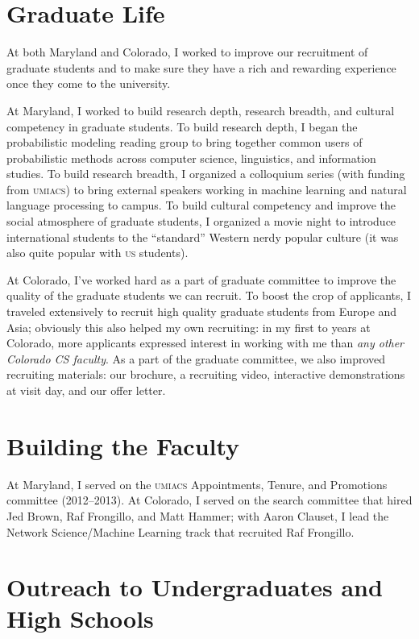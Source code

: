 \documentclass[11pt]{amsart}
\newcommand{\abr}[1]{\textsc{#1}}
\begin{document}
\section{Graduate Life}

At both Maryland and Colorado, I worked to improve our recruitment of graduate
students and to make sure they have a rich and rewarding experience once they
come to the university.

At Maryland, I worked to build research depth, research breadth, and cultural
competency in graduate students.  To build research depth, I began the
probabilistic modeling reading group to bring together common users of
probabilistic methods across computer science, linguistics, and information
studies.  To build research breadth, I organized a colloquium series (with
funding from \abr{umiacs}) to bring external speakers working in machine
learning and natural language processing to campus.  To build cultural
competency and improve the social atmosphere of graduate students, I organized a
movie night to introduce international students to the ``standard'' Western
nerdy popular culture (it was also quite popular with \abr{us} students).

At Colorado, I've worked hard as a part of graduate committee to improve the
quality of the graduate students we can recruit.  To boost the crop of
applicants, I traveled extensively to recruit high quality graduate students
from Europe and Asia; obviously this also helped my own recruiting: in my first
to years at Colorado, more applicants expressed interest in working with me than
\emph{any other Colorado CS faculty}.  As a part of the graduate committee, we
also improved recruiting materials: our brochure, a recruiting video,
interactive demonstrations at visit day, and our offer letter.

\section{Building the Faculty}

At Maryland, I served on the \abr{umiacs} Appointments, Tenure, and Promotions
committee (2012--2013).  At Colorado, I served on the search committee that
hired Jed Brown, Raf Frongillo, and Matt Hammer; with Aaron Clauset, I lead the
Network Science/Machine Learning track that recruited Raf Frongillo.

\section{Outreach to Undergraduates and High Schools}
\end{document}
